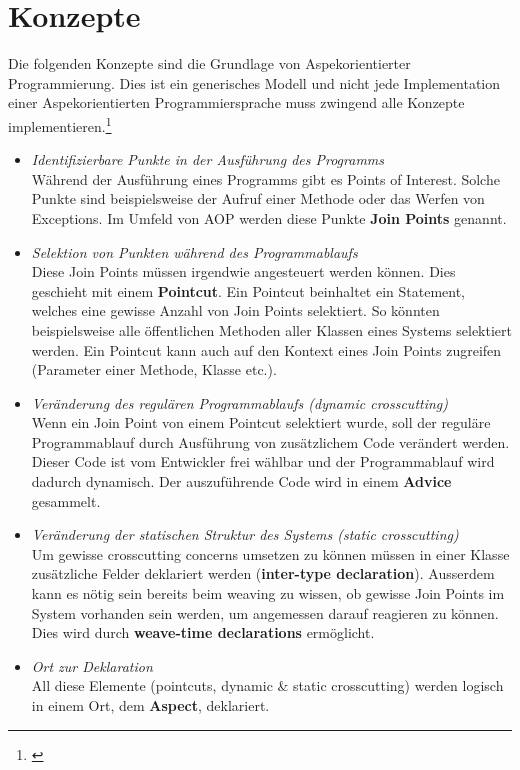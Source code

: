 \section{Konzepte}
\label{sec:aop_concepts}

Die folgenden Konzepte sind die Grundlage von Aspekorientierter Programmierung. Dies ist ein generisches Modell und nicht jede Implementation einer Aspekorientierten Programmiersprache muss zwingend alle Konzepte implementieren.\footnote{\cite[p~58]{laddad:aspectj}}

\begin{itemize}
\item \textit{Identifizierbare Punkte in der Ausführung des Programms} \\ Während der Ausführung eines Programms gibt es Points of Interest. Solche Punkte sind beispielsweise der Aufruf einer Methode oder das Werfen von Exceptions. Im Umfeld von AOP werden diese Punkte \textbf{Join Points} genannt. 
\item \textit{Selektion von Punkten während des Programmablaufs}\\ Diese Join Points müssen irgendwie angesteuert werden können. Dies geschieht mit einem \textbf{Pointcut}. Ein Pointcut beinhaltet ein Statement, welches eine gewisse Anzahl von Join Points selektiert. So könnten beispielsweise alle öffentlichen Methoden aller Klassen eines Systems selektiert werden. Ein Pointcut kann auch auf den Kontext eines Join Points zugreifen (Parameter einer Methode, Klasse etc.).
\item \textit{Veränderung des regulären Programmablaufs (dynamic crosscutting)}\\
Wenn ein Join Point von einem Pointcut selektiert wurde, soll der reguläre Programmablauf durch Ausführung von zusätzlichem Code verändert werden. Dieser Code ist vom Entwickler frei wählbar und der Programmablauf wird dadurch dynamisch. Der auszuführende Code wird in einem \textbf{Advice} gesammelt.
\item \textit{Veränderung der statischen Struktur des Systems (static crosscutting)}\\
Um gewisse crosscutting concerns umsetzen zu können müssen in einer Klasse zusätzliche Felder deklariert werden (\textbf{inter-type declaration}). Ausserdem kann es nötig sein bereits beim weaving zu wissen, ob gewisse Join Points im System vorhanden sein werden, um angemessen darauf reagieren zu können. Dies wird durch \textbf{weave-time declarations} ermöglicht.

\item \textit{Ort zur Deklaration}\\
All diese Elemente (pointcuts, dynamic \& static crosscutting) werden logisch in einem Ort, dem \textbf{Aspect}, deklariert.
\end{itemize}

